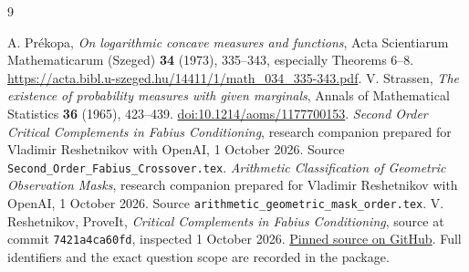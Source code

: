 \documentclass[11pt,a4paper]{article}
\theoremstyle{remark}\newtheorem*{ednote}{Editorial note (ProveIt, 2026-10-01)}
\begin{document}
\begin{thebibliography}{9}\small\raggedright
\setlength{\itemsep}{3pt}\setlength{\parskip}{0pt}
 A. Pr\'ekopa, \emph{On logarithmic concave measures and functions}, Acta Scientiarum Mathematicarum (Szeged) \textbf{34} (1973), 335--343, especially Theorems 6--8. \url{https://acta.bibl.u-szeged.hu/14411/1/math_034_335-343.pdf}.
 V. Strassen, \emph{The existence of probability measures with given marginals}, Annals of Mathematical Statistics \textbf{36} (1965), 423--439. \href{https://doi.org/10.1214/aoms/1177700153}{doi:10.1214/aoms/1177700153}.
 \emph{Second Order Critical Complements in Fabius Conditioning}, research companion prepared for Vladimir Reshetnikov with OpenAI, 1 October 2026. Source \texttt{Second\_Order\_Fabius\_Crossover.tex}.
 \emph{Arithmetic Classification of Geometric Observation Masks}, research companion prepared for Vladimir Reshetnikov with OpenAI, 1 October 2026. Source \texttt{arithmetic\_geometric\_mask\_order.tex}.
 V. Reshetnikov, ProveIt, \emph{Critical Complements in Fabius Conditioning}, source at commit \texttt{7421a4ca60fd}, inspected 1 October 2026. \href{https://github.com/VladimirReshetnikov/ProveIt/blob/7421a4ca60fdf125411edf412f825aac54278b37/Analysis/FabiusFunction/docs/semi-formalized-research-frontiers/drafts/representations/Critical_Complements_Sharp_Information_Loss/article.tex}{Pinned source on GitHub}. Full identifiers and the exact question scope are recorded in the package.
\end{thebibliography}
\end{document}

